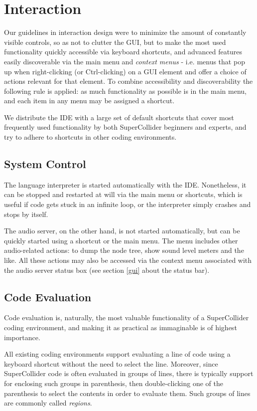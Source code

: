 \documentclass[11pt,a4paper]{article}
\begin{document}
\section{Interaction}

Our guidelines in interaction design were to minimize the amount of constantly visible controls, so as not to clutter
the GUI, but to make the most used functionality quickly accessible via keyboard shortcuts, and advanced features easily
discoverable via the main menu and \emph{context menus} - i.e. menus that pop up when right-clicking (or Ctrl-clicking)
on a GUI element and offer a choice of actions relevant for that element. To combine accessibility and discoverability
the following rule is applied: as much functionality as possible is in the main menu, and each item in any menu may be
assigned a shortcut.

We distribute the IDE with a large set of default shortcuts that cover most frequently used functionality by both
SuperCollider beginners and experts, and try to adhere to shortcuts in other coding environments.

\subsection{System Control}

The language interpreter is started automatically with the IDE. Nonetheless, it can be stopped and restarted at will
via the main menu or shortcuts, which is useful if code gets stuck in an infinite loop, or the interpreter simply
crashes and stops by itself.

The audio server, on the other hand, is not started automatically, but can be quickly started using a shortcut or the
main menu. The menu includes other audio-related actions: to dump the node tree, show sound level meters and the like.
All these actions may also be accessed via the context menu associated with the audio server status box (see section
\ref{gui} about the status bar).

\subsection{Code Evaluation}
\label{code-eval}

Code evaluation is, naturally, the most valuable functionality of a SuperCollider coding environment, and making it as
practical as immaginable is of highest importance.

All existing coding environments support evaluating a line of code using a keyboard shortcut without the need to select
the line. Moreover, since SuperCollider code is often evaluated in groups of lines, there is typically support for
enclosing such groups in parenthesis, then double-clicking one of the parenthesis to select the contents in order to
evaluate them. Such groups of lines are commonly called \emph{regions}.
\end{document}
